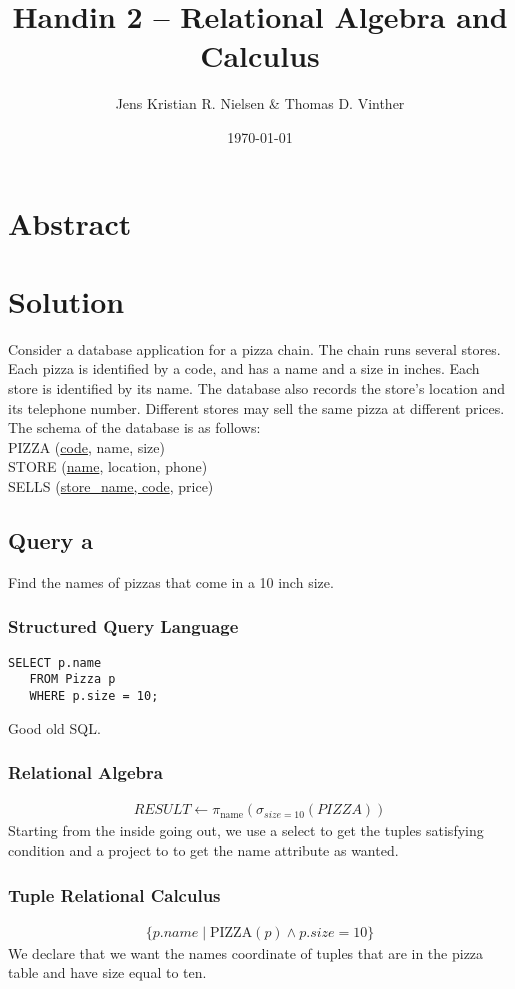 \documentclass{article}
\theoremstyle{remark}
\numberwithin{equation}{section}
\begin{document}
\author{Jens Kristian R. Nielsen \& Thomas D. Vinther }
\title{Handin 2 – Relational Algebra and Calculus}
\date{\today}
\maketitle

\section{Abstract}

\section{Solution}
Consider a database application for a pizza chain. The chain runs several stores. Each pizza is
identified by a code, and has a name and a size in inches. Each store is identified by its name. The database
also records the store’s location and its telephone number. Different stores may sell the same pizza at
different prices. The schema of the database is as follows:
\\PIZZA (\underline{code}, name, size)
\\STORE (\underline{name}, location, phone)
\\SELLS (\underline{store\_name, code}, price)
\subsection{Query a}
Find the names of pizzas that come in a 10 inch size.\\
\subsubsection{Structured Query Language}
\begin{verbatim}
SELECT p.name
   FROM Pizza p
   WHERE p.size = 10;
\end{verbatim}
Good old SQL.
\subsubsection{Relational Algebra}
\begin{align*}
    \textit{RESULT} \leftarrow\pi_{\text{name}}(\sigma_{\textit{size}=10}(PIZZA))
\end{align*}
Starting from the inside going out, we use a select to get the tuples satisfying condition and a project to to get the name attribute as wanted.
\subsubsection{Tuple Relational Calculus}
\begin{align*}
    \{p.name\mid\text{PIZZA}(p) \wedge p.size = 10\}
\end{align*}
We declare that we want the names coordinate of tuples that are in the pizza table and have size equal to ten.
\end{document}
